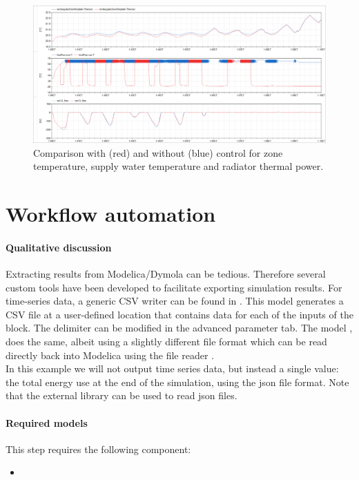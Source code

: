 \documentclass[10pt,a4paper]{article}
\begin{document}
\begin{figure}[h!]
	\centering
	\includegraphics[width=\linewidth]{Example7.png}
	\caption{Comparison with (red) and without (blue) control for zone temperature, supply water temperature and radiator thermal power.}
	\label{fig:res2}
\end{figure}

\newpage

\section{Workflow automation}
\paragraph{Qualitative discussion}
Extracting results from Modelica/Dymola can be tedious. 
Therefore several custom tools have been developed to facilitate exporting simulation results.
For time-series data, a generic CSV writer can be found in .
This model generates a CSV file at a user-defined location that contains
data for each of the inputs of the block. 
The delimiter can be modified in the advanced parameter tab.
The model , does the same, albeit using a slightly
different file format which can be read directly back into Modelica using the
file reader .\\

In this example we will not output time series data, but instead a single value: the total
energy use at the end of the simulation, using the json file format. 
Note that the external library  can be used to read json files.


\paragraph{Required models}
This step requires the following component:
\begin{itemize}
\item {}
\end{itemize}
\end{document}
